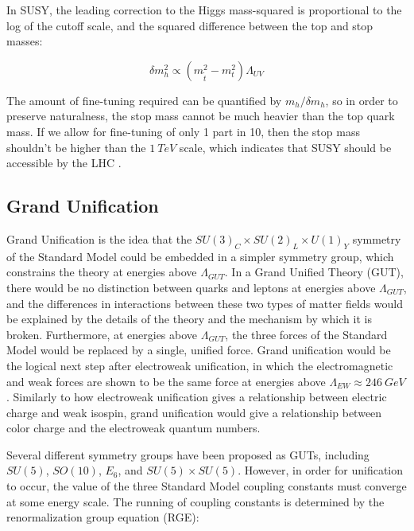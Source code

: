 In SUSY, the leading correction to the Higgs mass-squared is proportional to the log of the cutoff scale,
and the squared difference between the top and stop masses:

\begin{equation}\label{eq:susy_higgs_correction}
    \delta m_h^2 \propto \left(m_{\tilde{t}}^2 - m_t^2\right)  \Lambda_{UV}
\end{equation}\cite{susy-pheno-2000}

The amount of fine-tuning required can be quantified by $m_h / \delta m_h $, so in order to preserve naturalness,
the stop mass cannot be much heavier than the top quark mass.
If we allow for fine-tuning of only 1 part in 10, then the stop mass shouldn't be higher than the $1~TeV$ scale,
which indicates that SUSY should be accessible by the LHC .

\subsection{Grand Unification}\label{subsec:susy_unification}

Grand Unification is the idea that the $SU(3)_C \times SU(2)_L \times U(1)_Y$ symmetry of the Standard Model
could be embedded in a simpler symmetry group, which constrains the theory at energies above $\Lambda_{GUT}$.
In a Grand Unified Theory (GUT), there would be no distinction between quarks and leptons at energies above $\Lambda_{GUT}$,
and the differences in interactions between these two types of matter fields would be explained by the details of the
theory and the mechanism by which it is broken.
Furthermore, at energies above $\Lambda_{GUT}$, the three forces of the Standard Model would be replaced by a single, unified force.
Grand unification would be the logical next step after electroweak unification,
in which the electromagnetic and weak forces are shown to be the same force at energies above $\Lambda_{EW}\approx 246~GeV$.
Similarly to how electroweak unification gives a relationship between electric charge and weak isospin,
grand unification would give a relationship between color charge and the electroweak quantum numbers.

Several different symmetry groups have been proposed as GUTs, including $SU(5)$, $SO(10)$, $E_6$, and $SU(5)\times SU(5)$.\cite{susy-unification-1998}
However, in order for unification to occur, the value of the three Standard Model coupling constants must converge at some energy scale.
The running of coupling constants is determined by the renormalization group equation (RGE):

